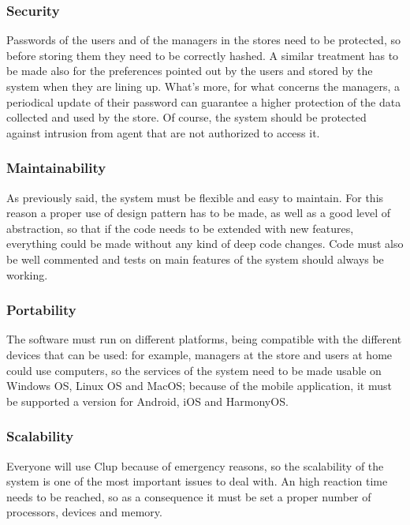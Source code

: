 \documentclass[]{article}
\begin{document}
			\subsubsection{Security}
			
			Passwords of the users and of the managers in the stores need to be protected, so before storing them they need to be correctly hashed. A similar treatment has to be made also for the preferences pointed out by the users and stored by the system when they are lining up. What’s more,  for what concerns the managers, a periodical update of their password can guarantee a higher protection of the data collected and used by the store. Of course, the system should be protected against intrusion from agent that are not authorized to access it. \\
			
			\subsubsection{Maintainability}
			
			As previously said, the system must be flexible and easy to maintain. For this reason a proper use of design pattern has to be made, as well as a good level of abstraction, so that if the code needs to be extended with new features, everything could be made without any kind of deep code changes. Code must also be well commented and tests on main features of the system should always be working.\\
			
			\subsubsection{Portability}

			The software must run on different platforms, being compatible with the different devices that can be used: for example, managers at the store and users at home could use computers, so the services of the system need to be made usable on Windows OS, Linux OS and MacOS; because of the mobile application, it must be supported a version for Android, iOS and HarmonyOS.\\
			
			\subsubsection{Scalability}

			Everyone will use Clup because of emergency reasons, so the scalability of the system is one of the most important issues to deal with. An high reaction time needs to be reached, so as a consequence it must be set a proper number of processors, devices and memory.\\
\end{document}
